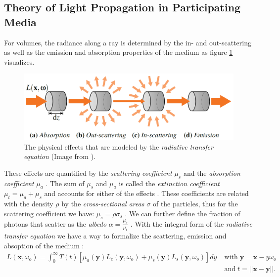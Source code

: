 \subsection{Theory of Light Propagation in Participating Media}
\label{subsec:theory_of_light_propagation_in_participating_media}
For volumes, the radiance along a ray is determined by the in- and out-scattering as well as the emission and absorption properties of the medium as figure \ref{fig:novak_volume_effects} visualizes\cite{novak_overview}.
\begin{figure}[ht]
    \centering
    \includegraphics[width=0.7\linewidth]{img/novak_volume_effects.png}
    \caption[Physical effects in a volume]{The physical effects that are modeled by the \textit{radiative transfer equation} (Image from \cite{novak_overview}).}
    \label{fig:novak_volume_effects}
\end{figure}
These effects are quantified by the \textit{scattering coefficient} $\mu_s$ and the \textit{absorption coefficient} $\mu_a$ \cite{novak_overview}.
The sum of $\mu_s$ and $\mu_a$ is called the \textit{extinction coefficient} $\mu_t=\mu_a + \mu_s$ and accounts for either of the effects \cite{novak_overview}.
These coefficients are related with the density $\rho$ by the \textit{cross-sectional areas} $\sigma$ of the particles, thus for the scattering coefficient we have: $\mu_s = \rho \sigma_s$ \cite{novak_overview}.
We can further define the fraction of photons that scatter as the \textit{albedo} $\alpha=\frac{\mu_s}{\mu_t}$ \cite{novak_overview}.
With the integral form of the \textit{radiative transfer equation} we have a way to formalize the scattering, emission and absoption of the medium \cite{novak_overview}:
\begin{equation}
    \begin{split}
        \label{eq:radiative_transfer}
        L(\boldsymbol{x}, \omega_o) = \int_0^\infty T(t)[\mu_a(\boldsymbol{y})L_e(\boldsymbol{y}, \omega_o) + \mu_s(\boldsymbol{y})L_s(\boldsymbol{y}, \omega_o)]dy & \;\text{with}\; \boldsymbol{y}=\boldsymbol{x} - y\omega_o \\
                                                                                                                                                                    & \;\text{and}\; t=||\boldsymbol{x}-\boldsymbol{y}||.
    \end{split}
\end{equation}
